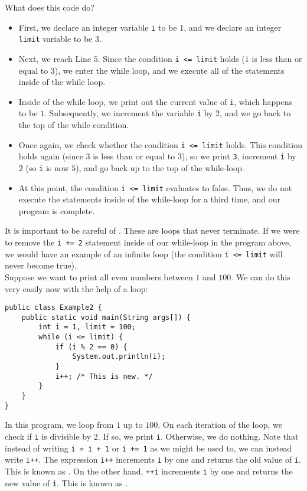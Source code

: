 What does this code do?

\begin{itemize}
    \item First, we declare an integer variable \verb!i! to be $1$, and we declare an integer \verb!limit! variable to be $3$.
    \item Next, we reach Line $5$. Since the condition \verb!i <= limit! holds ($1$ is less than or equal to $3$), we enter the while loop, and we execute all of the statements inside of the while loop.
    \item Inside of the while loop, we print out the current value of \verb!i!, which happens to be $1$. Subsequently, we increment the variable \verb!i! by $2$, and we go back to the top of the while condition. 
    \item Once again, we check whether the condition \verb!i <= limit! holds. This condition holds again (since $3$ is less than or equal to $3$), so we print \verb!3!, increment \verb!i! by $2$ (so \verb!i! is now $5$), and go back up to the top of the while-loop.
    \item At this point, the condition \verb!i <= limit! evaluates to false. Thus, we do not execute the statements inside of the while-loop for a third time, and our program is complete.
\end{itemize}


It is important to be careful of . These are loops that never terminate. If we were to remove the \verb!i += 2! statement inside of our while-loop in the program above, we would have an example of an infinite loop (the condition \verb!i <= limit! will never become true). \\


Suppose we want to print all even numbers between $1$ and $100$. We can do this very easily now with the help of a loop:

\begin{lstlisting}
public class Example2 {
    public static void main(String args[]) {
        int i = 1, limit = 100;
        while (i <= limit) {
            if (i % 2 == 0) {
                System.out.println(i);
            }
            i++; /* This is new. */
        }
    }
}
\end{lstlisting}

In this program, we loop from $1$ up to $100$. On each iteration of the loop, we check if \verb!i! is divisible by $2$. If so, we print \verb!i!. Otherwise, we do nothing. Note that instead of writing \verb!i = i + 1! or \verb!i += 1! as we might be used to, we can instead write \verb!i++!. The expression \verb!i++! increments \verb!i! by one and returns the old value of \verb!i!. This is known as . On the other hand, \verb!++i! increments \verb!i! by one and returns the new value of \verb!i!. This is known as .